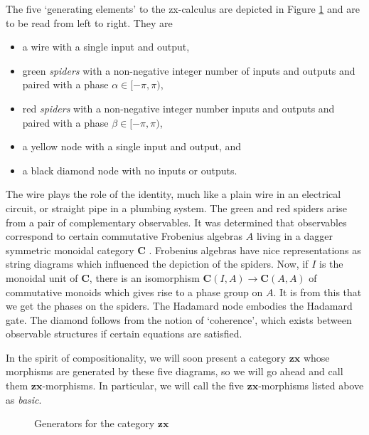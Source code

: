 \documentclass[11pt]{amsart}
\newcommand{\cat}[1]{\mathbf{#1}}
\theoremstyle{remark}
\theoremstyle{definition}
\begin{document}
The five `generating elements' to the zx-calculus are depicted in Figure \ref{fig:ZX generators} and are to be read from left to right. They are
\begin{itemize}
	\item a wire with a single input and output,
	\item green \emph{spiders} with a non-negative integer number of inputs and outputs and paired with a phase $\alpha \in [-\pi,\pi)$,
	\item red \emph{spiders} with a non-negative integer number inputs and outputs and paired with a phase $\beta \in [-\pi,\pi)$,
	\item a yellow node with a single input and output, and
	\item a black diamond node with no inputs or outputs.
\end{itemize}
The wire plays the role of the identity, much like a plain wire in an electrical circuit, or straight pipe in a plumbing system. The green and red spiders arise from a pair of complementary observables.  It was determined that observables correspond to certain commutative Frobenius algebras $A$ living in a dagger symmetric monoidal category $\cat{C}$ \cite{CoeckePavlovic_QuantumMeasSums, CoeckePavVicary_OrthBasis}.  Frobenius algebras have nice representations as string diagrams which influenced the depiction of the spiders. Now, if $I$ is the monoidal unit of $\cat{C}$, there is an isomorphism $\cat{C}(I,A) \to \cat{C}(A,A)$ of commutative monoids which gives rise to a phase group on $A$.  It is from this that we get the phases on the spiders. The Hadamard node embodies the Hadamard gate. The diamond follows from the notion of `coherence', which exists between observable structures if certain equations are satisfied.  

In the spirit of compositionality, we will soon present a category $\cat{zx}$ whose morphisms are generated by these five diagrams, so we will go ahead and call them $\cat{zx}$-morphisms. In particular, we will call the five $\cat{zx}$-morphisms listed above as \emph{basic}.
\begin{figure}
	\caption{Generators for the category $\cat{zx}$}
	\label{fig:ZX generators}
\end{figure}
\end{document}
